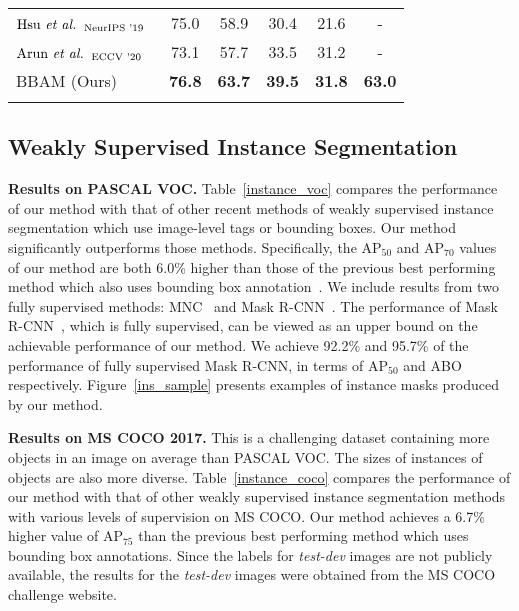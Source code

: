 \documentclass[final]{cvpr}
\begin{document}
\begin{table}[t]
\begin{tabular}{l @{\hskip 0.04in} c@{\hskip 0.04in}c @{\hskip 0.04in} c @{\hskip 0.04in}c@{\hskip 0.04in}c}
    $\text{Hsu \textit{et al.}}_{\text{~~NeurIPS '19}}$~\cite{hsu2019weakly} 
    & 75.0 & 58.9 &    30.4  &  21.6 & - \\
    $\text{Arun \textit{et al.}}_{\text{~~ECCV '20}}$~\cite{arun2020weakly} 
    & 73.1 & 57.7 &    33.5  &  31.2 & - \\
   
    BBAM (Ours) 
    & \textbf{76.8} & \textbf{63.7} &    \textbf{39.5}  &  \textbf{31.8} & \textbf{63.0} \\
\Xhline{1pt}
    \vspace{-2.1em}
    \end{tabular}

      \end{table} 
\subsection{Weakly Supervised Instance Segmentation}


\textbf{Results on PASCAL VOC.} Table~\ref{instance_voc} compares the performance of our method with that of other recent methods of weakly supervised instance segmentation which use image-level tags or bounding boxes. Our method significantly outperforms those methods. 
Specifically, the AP$_{50}$ and AP$_{70}$ values of our method are both 6.0\% higher than those of the previous best performing method which also uses bounding box annotation~\cite{arun2020weakly}.
We include results from two fully supervised methods: MNC~\cite{dai2016instance} and Mask R-CNN~\cite{he2017mask}. 
The performance of Mask R-CNN~\cite{he2017mask}, which is fully supervised, can be viewed as an upper bound on the achievable performance of our method.
We achieve 92.2\% and 95.7\% of the performance of fully supervised Mask R-CNN, in terms of AP$_{50}$ and ABO respectively. Figure~\ref{ins_sample} presents examples of instance masks produced by our method.



\textbf{Results on MS COCO 2017.}
This is a challenging dataset containing more objects in an image on average than PASCAL VOC.
The sizes of instances of objects are also more diverse.
Table~\ref{instance_coco} compares the performance of our method with that of other weakly supervised instance segmentation methods with various levels of supervision on MS COCO. Our method achieves a 6.7\% higher value of AP$_{75}$ than the previous best performing method which uses bounding box annotations. Since the labels for \textit{test-dev} images are not publicly available, the results for the \textit{test-dev} images were obtained from the MS COCO challenge website.
\end{document}
